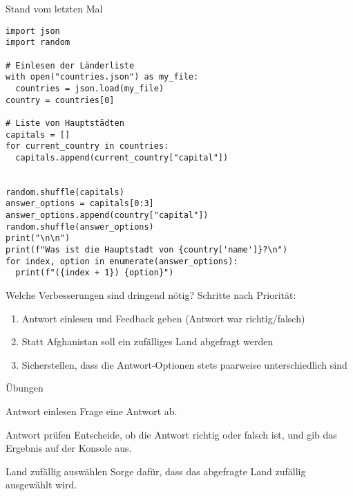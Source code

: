 \begin{fragile}

\begin{block}{Stand vom letzten Mal}
\begin{verbatim}
import json
import random

# Einlesen der Länderliste
with open("countries.json") as my_file:
  countries = json.load(my_file)
country = countries[0]

# Liste von Hauptstädten
capitals = []
for current_country in countries:
  capitals.append(current_country["capital"])


random.shuffle(capitals)
answer_options = capitals[0:3]
answer_options.append(country["capital"])
random.shuffle(answer_options)
print("\n\n")
print(f"Was ist die Hauptstadt von {country['name']}?\n")
for index, option in enumerate(answer_options):
  print(f"({index + 1}) {option}")
\end{verbatim}
\end{block}
	
\end{fragile}

\begin{frame}
\begin{block}{Welche Verbesserungen sind dringend nötig?}
	\vspace{2pt}
\pause 
Schritte nach Priorität: 
\pause 
	\begin{enumerate}[<+->]
		\item Antwort einlesen und Feedback geben (Antwort war richtig/falsch)
		\item Statt Afghanistan soll ein zufälliges Land abgefragt werden
		\item Sicherstellen, dass die Antwort-Optionen stets paarweise unterschiedlich sind
	\end{enumerate}	
\end{block}
\end{frame}


\begin{frame}{Übungen}
	
	\begin{block}{Antwort einlesen}
		\vspace{2pt}
		Frage eine Antwort ab. 	
	\end{block}
\vspace{12pt}
	
	\begin{block}{Antwort prüfen}
		\vspace{2pt}
		Entscheide, ob die Antwort richtig oder falsch ist, und gib das Ergebnis auf der Konsole aus. 
	\end{block}
\vspace{12pt}
	
	\begin{block}{Land zufällig auswählen}
		\vspace{2pt}
		Sorge dafür, dass das abgefragte Land zufällig ausgewählt wird. 
	\end{block}
	
	
\end{frame}

